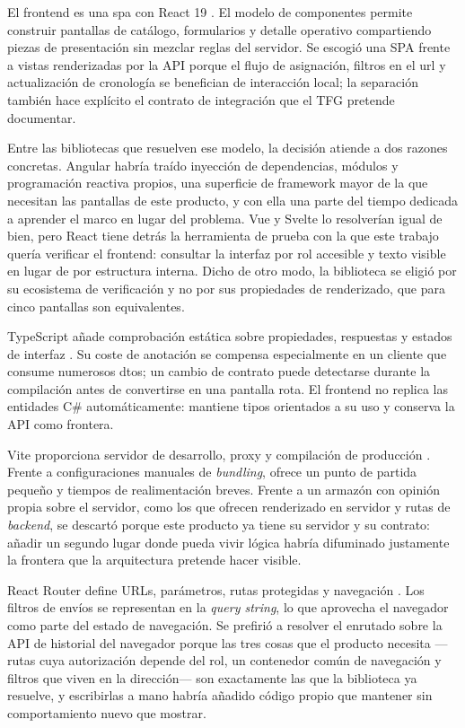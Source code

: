 El frontend es una \gls{spa} con React 19 \cite{react}. El modelo de componentes permite construir pantallas de catálogo, formularios y detalle operativo compartiendo piezas de presentación sin mezclar reglas del servidor. Se escogió una SPA frente a vistas renderizadas por la API porque el flujo de asignación, filtros en el \gls{url} y actualización de cronología se benefician de interacción local; la separación también hace explícito el contrato de integración que el TFG pretende documentar.

Entre las bibliotecas que resuelven ese modelo, la decisión atiende a dos razones concretas. Angular habría traído inyección de dependencias, módulos y programación reactiva propios, una superficie de framework mayor de la que necesitan las pantallas de este producto, y con ella una parte del tiempo dedicada a aprender el marco en lugar del problema. Vue y Svelte lo resolverían igual de bien, pero React tiene detrás la herramienta de prueba con la que este trabajo quería verificar el frontend: consultar la interfaz por rol accesible y texto visible en lugar de por estructura interna. Dicho de otro modo, la biblioteca se eligió por su ecosistema de verificación y no por sus propiedades de renderizado, que para cinco pantallas son equivalentes.

TypeScript añade comprobación estática sobre propiedades, respuestas y estados de interfaz \cite{typescript}. Su coste de anotación se compensa especialmente en un cliente que consume numerosos \glspl{dto}; un cambio de contrato puede detectarse durante la compilación antes de convertirse en una pantalla rota. El frontend no replica las entidades C\# automáticamente: mantiene tipos orientados a su uso y conserva la API como frontera.

Vite proporciona servidor de desarrollo, proxy y compilación de producción \cite{vite}. Frente a configuraciones manuales de \emph{bundling}, ofrece un punto de partida pequeño y tiempos de realimentación breves. Frente a un armazón con opinión propia sobre el servidor, como los que ofrecen renderizado en servidor y rutas de \emph{backend}, se descartó porque este producto ya tiene su servidor y su contrato: añadir un segundo lugar donde pueda vivir lógica habría difuminado justamente la frontera que la arquitectura pretende hacer visible.

React Router define URLs, parámetros, rutas protegidas y navegación \cite{reactrouter}. Los filtros de envíos se representan en la \emph{query string}, lo que aprovecha el navegador como parte del estado de navegación. Se prefirió a resolver el enrutado sobre la API de historial del navegador porque las tres cosas que el producto necesita ---rutas cuya autorización depende del rol, un contenedor común de navegación y filtros que viven en la dirección--- son exactamente las que la biblioteca ya resuelve, y escribirlas a mano habría añadido código propio que mantener sin comportamiento nuevo que mostrar.

